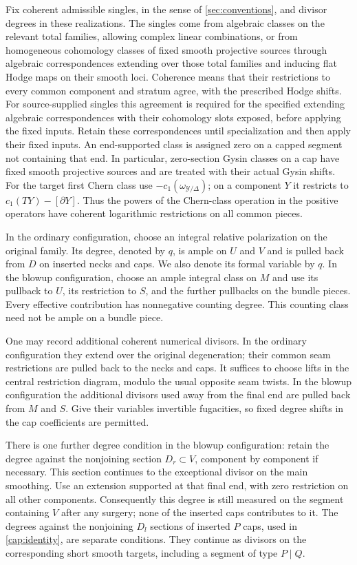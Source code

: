 Fix coherent admissible singles, in the sense of
\cref{sec:conventions}, and divisor degrees in these realizations.
The singles come from algebraic classes on the relevant total
families, allowing complex linear combinations, or from homogeneous
cohomology classes of fixed smooth projective sources through
algebraic correspondences extending over those total families and
inducing flat Hodge maps on their smooth loci.
Coherence means that their restrictions to every common component and
stratum agree, with the prescribed Hodge shifts.  For source-supplied
singles this agreement is required for the specified extending
algebraic correspondences with their cohomology slots exposed, before
applying the fixed inputs.  Retain these correspondences until
specialization and then apply their fixed inputs.  An end-supported
class is assigned zero on a capped segment not containing that end.
In particular, zero-section Gysin classes on a cap have fixed smooth
projective sources and are treated with their actual Gysin shifts.
For the target first Chern class use
$-c_1(\omega_{\mathcal Y/\Delta})$; on a component $Y$ it restricts to
$c_1(TY)-[\partial Y]$.  Thus the powers of the Chern-class operation in
the positive operators have coherent logarithmic restrictions on all
common pieces.

In the ordinary configuration, choose an integral relative
polarization on the original family.  Its degree, denoted by $q$, is
ample on $U$ and $V$ and is pulled back from $D$ on inserted necks and
caps.  We also denote its formal variable by $q$.  In the blowup
configuration, choose an ample integral class on $M$ and use its
pullback to $U$, its restriction to $S$, and the further pullbacks on
the bundle pieces.  Every effective contribution has nonnegative
counting degree.  This counting class need not be ample on a bundle
piece.

One may record additional coherent numerical divisors.  In the
ordinary configuration they extend over the original degeneration;
their common seam restrictions are pulled back to the necks and caps.
It suffices to choose lifts in the central restriction diagram, modulo
the usual opposite seam twists.  In the blowup configuration the
additional divisors used away from the final end are pulled back from
$M$ and $S$.  Give their variables invertible fugacities, so fixed
degree shifts in the cap coefficients are permitted.

There is one further degree condition in the blowup configuration:
retain the degree against the nonjoining section $D_r\subset V$,
component by component if necessary.  This section continues to the
exceptional divisor on the main smoothing.  Use an extension supported
at that final end, with zero restriction on all other components.
Consequently this degree is still measured on the segment containing
$V$ after any surgery; none of the inserted caps contributes to it.
The degrees against the nonjoining $D_l$ sections of inserted $P$ caps,
used in \cref{cap:identity}, are separate conditions.  They continue as
divisors on the corresponding short smooth targets, including a
segment of type $P\mid Q$.

